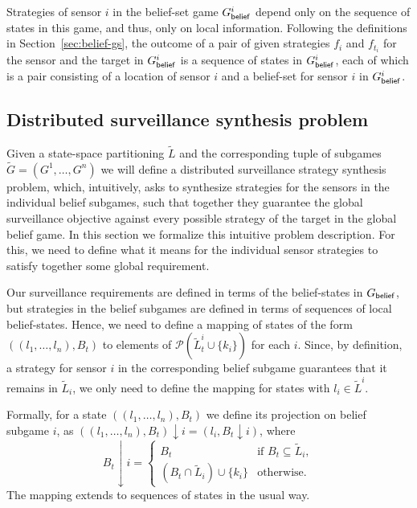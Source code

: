 Strategies of sensor $i$ in the belief-set game $G^{i}_{\mathsf{belief}}$ depend only on the sequence of states in this game, and thus, only on local information. Following the definitions in Section~\ref{sec:belief-gs}, the outcome of a pair of given strategies $f_{i}$ and $f_{t_i}$ for the sensor and the target in $G^{i}_{\mathsf{belief}}$  is a sequence of  states in  $G^{i}_{\mathsf{belief}}$, each of which is a pair consisting of a location of sensor $i$ and a belief-set for sensor $i$ in $G^{i}_{\mathsf{belief}}$.


\subsection{Distributed surveillance synthesis problem}\label{sec:distributed-problem}
Given a state-space partitioning $\widetilde L$ and the corresponding tuple of subgames $\widetilde G = (G^1,\ldots,G^n)$
we will define a distributed surveillance strategy synthesis problem, which, intuitively, asks to synthesize strategies for the sensors in the individual belief subgames, such that together they guarantee the global surveillance objective against every possible strategy of the target in the global belief game.  In this section we formalize this intuitive problem description. For this, we  need to define what it means for the individual sensor strategies to satisfy together some global requirement.

Our surveillance requirements are defined in terms of the belief-states in $G_{\mathsf{belief}}$, but strategies in the belief subgames are defined in terms of sequences of local belief-states. Hence, we need to define a mapping of states of the form $((l_1,\ldots,l_n),B_t)$ to elements of $\mathcal{P}(\widetilde{L}^i_t \cup \{k_i\})$ for each $i$. Since, by definition, a strategy for sensor $i$ in the corresponding belief subgame guarantees that it remains in $\widetilde L_i$, we only need to define the mapping for states with $l_i \in\widetilde{L}^i$.

Formally, for a state $((l_1,\ldots,l_n),B_t)$  we define its projection on belief subgame $i$, as $((l_1,\ldots,l_n),B_t){\downarrow}i = (l_i,B_t{\downarrow}i)$, where
\[B_t{\downarrow}i = \begin{cases}
B_t& \text{if }  B_t \subseteq \widetilde L_i, \\
(B_t \cap \widetilde L_i) \cup \{k_i\} & \text{otherwise}.
\end{cases}\]
The mapping extends to sequences of states in the usual way. 

